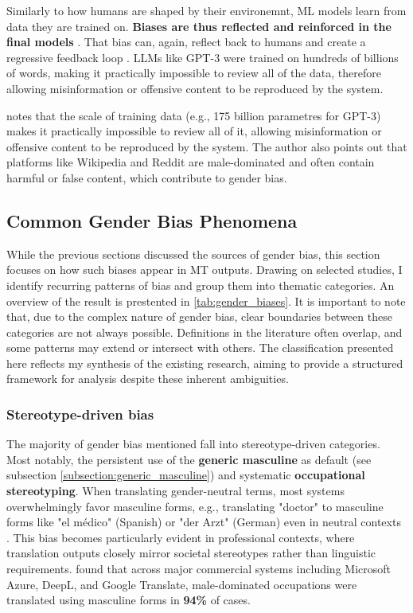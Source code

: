 Similarly to how humans are shaped by their environemnt, ML models learn from data they are trained on. \textbf{Biases are thus reflected and reinforced in the final models} \citep{stanczakSurveyGenderBias2021,smacchiaDoesAIReflect2024}. That bias can, again, reflect back to humans and create a regressive feedback loop \citep{barclayInvestigatingMarkersDrivers2024a,shresthaExploringGenderBiases2022}. LLMs like GPT-3 were trained on hundreds of billions of words, making it practically impossible to review all of the data, therefore allowing misinformation or offensive content to be reproduced by the system.

\citet{ullmannGenderBiasMachine2022} notes that the scale of training data (e.g., 175 billion parametres for GPT-3) makes it practically impossible to review all of it, allowing misinformation or offensive content to be reproduced by the system. The author also points out that platforms like Wikipedia and Reddit are male-dominated and often contain harmful or false content, which contribute to gender bias.

\subsection{Common Gender Bias Phenomena}
While the previous sections discussed the sources of gender bias, this section focuses on how such biases appear in MT outputs. Drawing on selected studies, I identify recurring patterns of bias and group them into thematic categories. An overview of the result is prestented in \autoref{tab:gender_biases}. It is important to note that, due to the complex nature of gender bias, clear boundaries between these categories are not always possible. Definitions in the literature often overlap, and some patterns may extend or intersect with others. The classification presented here reflects my synthesis of the existing research, aiming to provide a structured framework for analysis despite these inherent ambiguities.

\subsubsection{Stereotype-driven bias}

The majority of gender bias mentioned fall into stereotype-driven categories. Most notably, the persistent use of the \textbf{generic masculine} as default (see subsection \ref{subsection:generic_masculine}) and systematic \textbf{occupational stereotyping}. When translating gender-neutral terms, most systems overwhelmingly favor masculine forms, e.g., translating "doctor" to masculine forms like "el médico" (Spanish) or "der Arzt" (German) even in neutral contexts \citep{smacchiaDoesAIReflect2024,choMeasuringGenderBias2019,pratesAssessingGenderBias2019}. This bias becomes particularly evident in professional contexts, where translation outputs closely mirror societal stereotypes rather than linguistic requirements. \citet{smacchiaDoesAIReflect2024} found that across major commercial systems including Microsoft Azure, DeepL, and Google Translate, male-dominated occupations were translated using masculine forms in \textbf{94\%} of cases.

